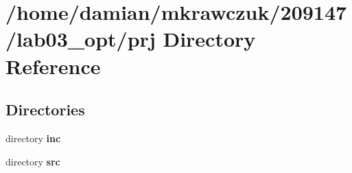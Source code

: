 \section{/home/damian/mkrawczuk/209147/lab03\-\_\-opt/prj Directory Reference}
\label{dir_4aa64b0872d36146e049722e293482e3}
\subsection*{Directories}
\begin{DoxyCompactItemize}
\item 
directory {\bf inc}
\item 
directory {\bf src}
\end{DoxyCompactItemize}
